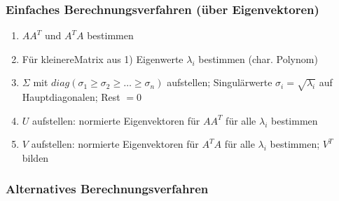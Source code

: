 \subsubsection{Einfaches Berechnungsverfahren (über Eigenvektoren)}
\begin{enumerate}
    \item \(AA^T\) und \(A^TA\) bestimmen
    \item Für \glqq kleinere\dq Matrix aus 1) Eigenwerte \(\lambda_i\) bestimmen (char. Polynom)
    \item \(\Sigma\) mit \(diag(\sigma_1 \geq \sigma_2 \geq \hdots \geq \sigma_n)\) aufstellen; Singulärwerte \(\sigma_i = \sqrt{\lambda_i}\) auf Hauptdiagonalen; Rest \(=0\)
    \item \(U\) aufstellen: normierte Eigenvektoren für \(AA^T\) für alle \(\lambda_i\) bestimmen
    \item \(V\) aufstellen: normierte Eigenvektoren für \(A^TA\) für alle \(\lambda_i\) bestimmen; \(V^T\) bilden
\end{enumerate}



\subsubsection{Alternatives Berechnungsverfahren}

